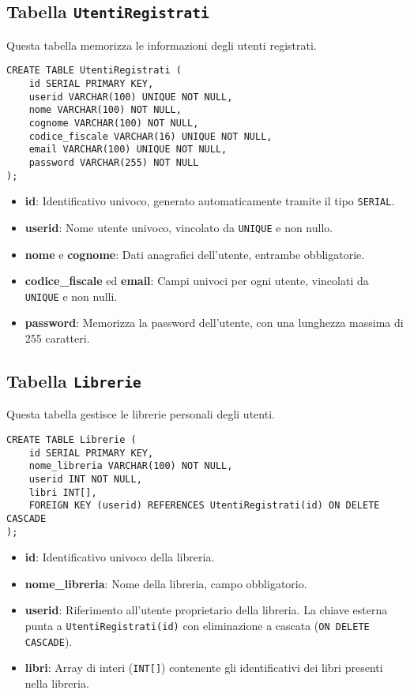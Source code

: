 \documentclass{report}
\begin{document}
\subsection{Tabella \texttt{UtentiRegistrati}}
Questa tabella memorizza le informazioni degli utenti registrati.

\begin{lstlisting}
CREATE TABLE UtentiRegistrati (
    id SERIAL PRIMARY KEY,
    userid VARCHAR(100) UNIQUE NOT NULL,
    nome VARCHAR(100) NOT NULL,
    cognome VARCHAR(100) NOT NULL,
    codice_fiscale VARCHAR(16) UNIQUE NOT NULL,
    email VARCHAR(100) UNIQUE NOT NULL,
    password VARCHAR(255) NOT NULL
);
\end{lstlisting}

\begin{itemize}
    \item \textbf{id}: Identificativo univoco, generato automaticamente tramite il tipo \texttt{SERIAL}.
    \item \textbf{userid}: Nome utente univoco, vincolato da \texttt{UNIQUE} e non nullo.
    \item \textbf{nome} e \textbf{cognome}: Dati anagrafici dell'utente, entrambe obbligatorie.
    \item \textbf{codice\_fiscale} ed \textbf{email}: Campi univoci per ogni utente, vincolati da \texttt{UNIQUE} e non nulli.
    \item \textbf{password}: Memorizza la password dell'utente, con una lunghezza massima di 255 caratteri.
\end{itemize}

\subsection{Tabella \texttt{Librerie}}
Questa tabella gestisce le librerie personali degli utenti.

\begin{lstlisting}
CREATE TABLE Librerie (
    id SERIAL PRIMARY KEY,
    nome_libreria VARCHAR(100) NOT NULL,
    userid INT NOT NULL,
    libri INT[],
    FOREIGN KEY (userid) REFERENCES UtentiRegistrati(id) ON DELETE CASCADE
);
\end{lstlisting}

\begin{itemize}
    \item \textbf{id}: Identificativo univoco della libreria.
    \item \textbf{nome\_libreria}: Nome della libreria, campo obbligatorio.
    \item \textbf{userid}: Riferimento all'utente proprietario della libreria. La chiave esterna punta a \texttt{UtentiRegistrati(id)} con eliminazione a cascata (\texttt{ON DELETE CASCADE}).
    \item \textbf{libri}: Array di interi (\texttt{INT[]}) contenente gli identificativi dei libri presenti nella libreria.
\end{itemize}
\end{document}
